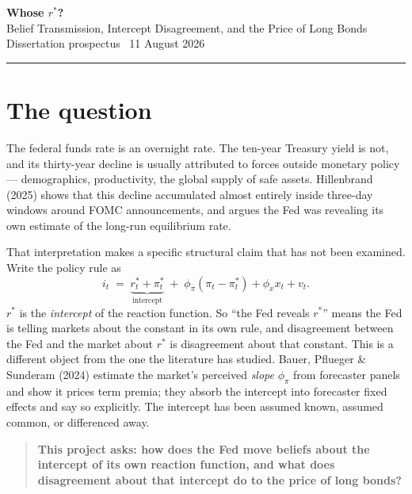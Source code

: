 \documentclass[11pt]{article}
\newcommand{\rs}{$r^{*}$}
\begin{document}
\begin{center}
{\large\textbf{Whose \boldmath$r^{*}$?}}\\[0.3em]
{\normalsize Belief Transmission, Intercept Disagreement, and the Price of Long Bonds}\\[0.6em]
{\small Dissertation prospectus \textperiodcentered\ 11 August 2026}
\end{center}
\vspace{0.2em}
\noindent\rule{\textwidth}{0.4pt}
\suppressfloats[t]

\section{The question}

The federal funds rate is an overnight rate. The ten-year Treasury yield is not, and its
thirty-year decline is usually attributed to forces outside monetary policy --- demographics,
productivity, the global supply of safe assets. Hillenbrand (2025) shows that this decline
accumulated almost entirely inside three-day windows around FOMC announcements, and argues
the Fed was revealing its own estimate of the long-run equilibrium rate.

That interpretation makes a specific structural claim that has not been examined. Write the
policy rule as
\begin{equation}
i_t \;=\; \underbrace{r^{*}_t + \pi^{*}_t}_{\text{intercept}} \;+\; \phi_\pi\!\left(\pi_t - \pi^{*}_t\right) + \phi_x x_t + v_t .
\label{eq:rule}
\end{equation}
\rs{} is the \emph{intercept} of the reaction function. So ``the Fed reveals \rs{}'' means the
Fed is telling markets about the constant in its own rule, and disagreement between the Fed
and the market about \rs{} is disagreement about that constant. This is a different object
from the one the literature has studied. Bauer, Pflueger \& Sunderam (2024) estimate the
market's perceived \emph{slope} $\phi_\pi$ from forecaster panels and show it prices term
premia; they absorb the intercept into forecaster fixed effects and say so explicitly. The
intercept has been assumed known, assumed common, or differenced away.

\begin{quote}
\textbf{This project asks: how does the Fed move beliefs about the intercept of its own
reaction function, and what does disagreement about that intercept do to the price of long
bonds?}
\end{quote}
\end{document}
